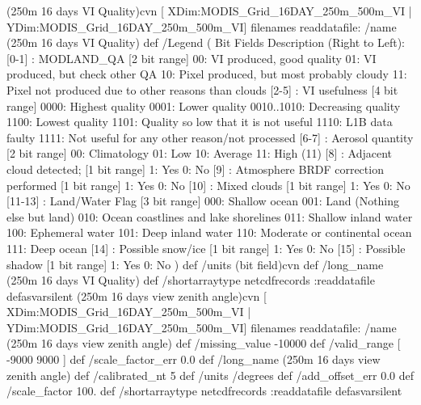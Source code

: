  (250m 16 days VI Quality)cvn{
[ XDim:MODIS_Grid_16DAY_250m_500m_VI | YDim:MODIS_Grid_16DAY_250m_500m_VI] filenames readdatafile:
/name (250m 16 days VI Quality) def
 /Legend (
	 Bit Fields Description (Right to Left):
	[0-1] : MODLAND_QA [2 bit range]
		 00: VI produced, good quality
		 01: VI produced, but check other QA
		 10: Pixel produced, but most probably cloudy
		 11: Pixel not produced due to other reasons than clouds
	[2-5] : VI usefulness [4 bit range]
		 0000: Highest quality
		 0001: Lower quality
		 0010..1010: Decreasing quality
		 1100: Lowest quality
		 1101: Quality so low that it is not useful
		 1110: L1B data faulty
		 1111: Not useful for any other reason/not processed
	[6-7] : Aerosol quantity [2 bit range]
		 00: Climatology
		 01: Low
		 10: Average
		 11: High (11)
	[8] : Adjacent cloud detected; [1 bit range]
		 1: Yes
		 0: No
	[9] : Atmosphere BRDF correction performed [1 bit range]
		 1: Yes
		 0: No
	[10] : Mixed clouds  [1 bit range]
		 1: Yes
		 0: No
	[11-13] : Land/Water Flag [3 bit range]
		 000: Shallow ocean
		 001: Land (Nothing else but land)
		 010: Ocean coastlines and lake shorelines
		 011: Shallow inland water
		 100: Ephemeral water
		 101: Deep inland water
		 110: Moderate or continental ocean
		 111: Deep ocean
	[14] : Possible snow/ice [1 bit range]
		 1: Yes
		 0: No
	[15] : Possible shadow [1 bit range]
		 1: Yes
		 0: No
) def
 /units (bit field)cvn def
 /long_name (250m 16 days VI Quality) def
 /shortarraytype netcdfrecords :readdatafile
}defasvarsilent
 (250m 16 days view zenith angle)cvn{
[ XDim:MODIS_Grid_16DAY_250m_500m_VI | YDim:MODIS_Grid_16DAY_250m_500m_VI] filenames readdatafile:
/name (250m 16 days view zenith angle) def
 /missing_value -10000 def
 /valid_range [ -9000 9000 ] def
 /scale_factor_err 0.0 def
 /long_name (250m 16 days view zenith angle) def
 /calibrated_nt 5 def
 /units /degrees def
 /add_offset_err 0.0 def
 /scale_factor 100. def
 /shortarraytype netcdfrecords :readdatafile
}defasvarsilent

